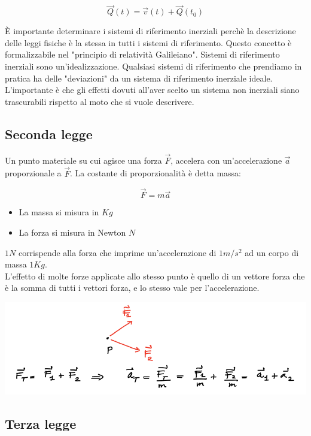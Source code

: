 \documentclass{article}
\begin{document}
$$
\vec{Q}(t) = \vec{v}(t) + \vec{Q}(t_0)
$$

\noindent
È importante determinare i sistemi di riferimento inerziali perchè la descrizione delle leggi fisiche è la stessa in tutti i sistemi di riferimento.
Questo concetto è formalizzabile nel "principio di relatività Galileiano".
Sistemi di riferimento inerziali sono un'idealizzazione.
Qualsiasi sistemi di riferimento che prendiamo in pratica ha delle "deviazioni" da un sistema di riferimento inerziale ideale.
L'importante è che gli effetti dovuti all'aver scelto un sistema non inerziali siano trascurabili rispetto al moto che si vuole descrivere.

\subsection{Seconda legge}

Un punto materiale su cui agisce una forza $\vec{F}$, accelera con un'accelerazione $\vec{a}$ proporzionale a $\vec{F}$.
La costante di proporzionalità è detta massa:

$$
\vec{F} = m \vec{a}
$$

\begin{itemize}
    \item La massa si misura in $Kg$
    \item La forza si misura in Newton $N$
\end{itemize}

\noindent
$1N$ corrispende alla forza che imprime un'accelerazione di $1 m/s^2$ ad un corpo di massa $1 Kg$.\\

\noindent
L'effetto di molte forze applicate allo stesso punto è quello di un vettore forza che è la somma di tutti i vettori forza,
e lo stesso vale per l'accelerazione.

\includegraphics[width=\columnwidth]{seconda-legge-somma-forze}

\subsection{Terza legge}
\end{document}
